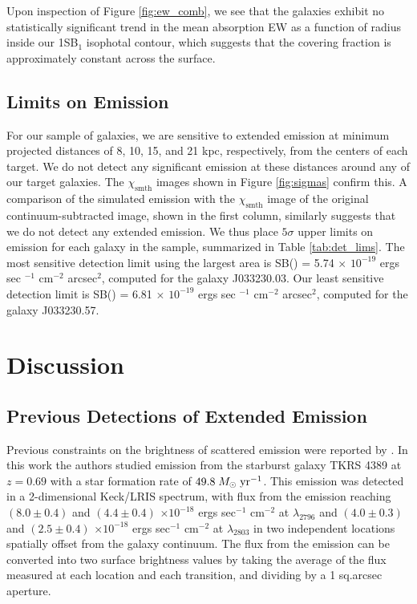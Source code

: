 \documentclass[twocolumn]{aastex61}
\def \msunperyr {{\; M_{\odot}\rm \;yr^{-1}}}
\begin{document}
Upon inspection of Figure \ref{fig:ew_comb}, we see that the galaxies exhibit no statistically significant trend in the mean absorption EW as a function of radius inside our 1SB$_1$ isophotal contour, which suggests that the covering fraction is approximately constant across the surface.

\subsection{Limits on  Emission}
For our sample of galaxies, we are sensitive to extended emission at minimum projected distances of 
8, 10, 15, and 21 kpc, respectively, from the centers of each target.
We do not detect any significant  emission at these distances around any of our target galaxies. The $\chi_{\text{smth}}$ images shown in Figure \ref{fig:sigmas} confirm this. A comparison of the simulated emission with the $\chi_{\text{smth}}$ image of the original continuum-subtracted image, shown in the first column, similarly suggests that we do not detect any extended  emission. We thus place $5\sigma$ upper limits on  emission for each galaxy in the sample, summarized in Table \ref{tab:det_lims}. The most sensitive detection limit using the largest area is SB() = 5.74 $\times$ $10^{-19}$ ergs sec $^{-1}$ cm$^{-2}$ arcsec$^2$, computed for the galaxy J033230.03. Our least sensitive detection limit is SB() = 6.81 $\times$ $10^{-19}$ ergs sec $^{-1}$ cm$^{-2}$ arcsec$^2$, computed for the galaxy J033230.57.

\section{Discussion}\label{sec:discussion}

\subsection{Previous Detections of Extended  Emission}
Previous constraints on the brightness of scattered  emission were reported by \cite{Rubin_2011}. In this work the authors studied emission from the starburst galaxy TKRS 4389 at $z = 0.69$ with a star formation rate of $49.8\msunperyr$. This emission was detected in a 2-dimensional Keck/LRIS spectrum, with flux from the emission reaching $(8.0 \pm 0.4)$ and $(4.4 \pm 0.4)$ $\times10^{-18}$ ergs sec$^{-1}$ cm$^{-2}$ at  $\lambda _{2796}$ and $(4.0 \pm 0.3)$ and $(2.5 \pm 0.4)$ $\times10^{-18}$ ergs sec$^{-1}$ cm$^{-2}$ at $\lambda_{2803}$ in two independent locations spatially offset from the galaxy continuum. The flux from the emission can be converted into two surface brightness values by taking the average of the flux measured at each location and each transition, and dividing by a 1 sq.arcsec aperture. 
\end{document}
